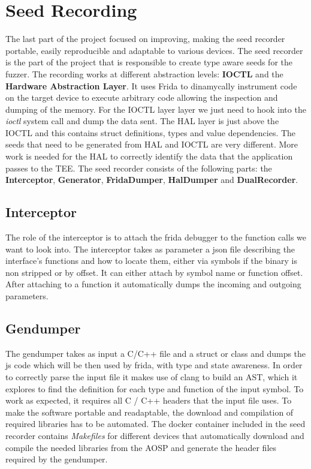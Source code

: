 \documentclass[a4paper,11pt,oneside]{article}
\begin{document}

\section{Seed Recording}
\label{sub:seedrecorder}
The last part of the project focused on improving, making the seed
recorder portable, easily reproducible and adaptable to various devices.
The seed recorder is the part of the project that is
responsible to create type aware seeds for the fuzzer.
The recording works at different abstraction levels:
\textbf{IOCTL} and the \textbf{Hardware Abstraction Layer}.
It uses Frida to dinamycally instrument code on the target device to execute arbitrary code allowing the inspection and dumping of the memory.
For the IOCTL layer
layer we just need to hook into the \emph{ioctl} system
call and dump the data sent.
The HAL layer is just above the IOCTL and this contains struct definitions, types and value dependencies.
The seeds that need to be generated from HAL and IOCTL are very different. More work is needed for the HAL to correctly identify the data that the
application passes to the TEE.
The seed recorder consists of the following parts: the \textbf{Interceptor}, \textbf{Generator}, \textbf{FridaDumper}, \textbf{HalDumper} and \textbf{DualRecorder}.
\subsection{Interceptor}
The role of the interceptor is to attach the frida debugger to the function calls we want to look into.
The interceptor takes as parameter a json file describing
the interface's functions and how to locate them, either via symbols if the binary is non stripped or by offset.
It can either attach by symbol name or function offset.
After attaching to a function it automatically dumps the incoming and outgoing parameters.
\label{sec:Gendumper}
\subsection{Gendumper}
The gendumper takes as input a C/C++ file and a struct or class and dumps the js code which will be then used by frida, with type and state awareness. In order to correctly parse the input file it makes use of clang to build an
AST, which it explores to find the definition for each type and function of the input symbol. To work as
expected, it requires all C / C++ headers that the input file uses. To make the software portable and readaptable, the download and compilation of required libraries has to be automated. The docker container included in the seed recorder contains \emph{Makefiles} for different devices that automatically download and compile the needed libraries from the AOSP and generate the header files required by the gendumper.
\end{document}
